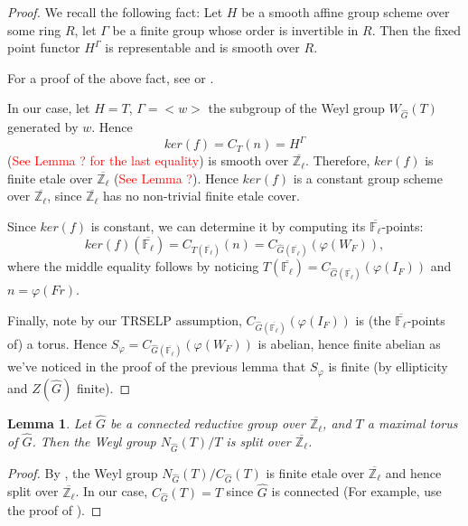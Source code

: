 \documentclass{article}
\newcommand{\red}[1]{\textcolor{red}{#1}}
\newtheorem{lemma}{Lemma}
\begin{document}
\begin{proof}
	We recall the following fact: Let $H$ be a smooth affine group scheme over some ring $R$, let $\Gamma$ be a finite group whose order is invertible in $R$. Then the fixed point functor $H^{\Gamma}$ is representable and is smooth over $R$.
	
	For a proof of the above fact, see \cite[Proposition 3.4]{edixhoven1992neron} or \cite[Lemma A.1, A.13]{dhkm2020moduli}.
	
	In our case, let $H=T$, $\Gamma=<w>$ the subgroup of the Weyl group $W_{\hat{G}}(T)$ generated by $w$. Hence $$ker(f)=C_T(n)=H^{\Gamma}$$
	(\red{See Lemma ? for the last equality}) is smooth over $\overline{\mathbb{Z}_{\ell}}$. Therefore, $ker(f)$ is finite etale over $\overline{\mathbb{Z}_{\ell}}$ (\red{See Lemma ?}). Hence $ker(f)$ is a constant group scheme over $\overline{\mathbb{Z}_{\ell}}$, since $\overline{\mathbb{Z}_{\ell}}$ has no non-trivial finite etale cover.
	
	Since $ker(f)$ is constant, we can determine it by computing its $\overline{\mathbb{F}_{\ell}}$-points:
	$$ker(f)(\overline{\mathbb{F}_{\ell}})=C_{T(\overline{\mathbb{F}_{\ell}})}(n)=C_{\hat{G}(\overline{\mathbb{F}_{\ell}})}(\varphi(W_F)),$$
	where the middle equality follows by noticing $T(\overline{\mathbb{F}_{\ell}})=C_{\hat{G}(\overline{\mathbb{F}_{\ell}})}(\varphi(I_F))$ and $n=\varphi(Fr)$.
	
	Finally, note by our TRSELP assumption, $C_{\hat{G}(\overline{\mathbb{F}_{\ell}})}(\varphi(I_F))$ is (the $\overline{\mathbb{F}_{\ell}}$-points of) a torus. Hence $S_{\varphi}=C_{\hat{G}(\overline{\mathbb{F}_{\ell}})}(\varphi(W_F))$ is abelian, hence finite abelian as we've noticed in the proof of the previous lemma that $S_\varphi$ is finite (by ellipticity and $Z(\hat{G})$ finite).
\end{proof}

\begin{lemma}\label{Lem Wely}
	Let $\hat{G}$ be a connected reductive group over $\overline{\mathbb{Z}_{\ell}}$, and $T$ a maximal torus of $\hat{G}$. Then the Weyl group $N_{\hat{G}}(T)/T$ is split over $\overline{\mathbb{Z}_{\ell}}$.
\end{lemma}

\begin{proof}
	By \cite[Proposition 3.2.8]{conrad2014reductive}, the Weyl group $N_{\hat{G}}(T)/C_{\hat{G}}(T)$ is finite etale over $\overline{\mathbb{Z}_{\ell}}$ and hence split over $\overline{\mathbb{Z}_{\ell}}$. In our case, $C_{\hat{G}}(T)=T$ since $\hat{G}$ is connected (For example, use the proof of \cite[Theorem 3.1.12]{conrad2014reductive}).
\end{proof}
	


\end{document}
